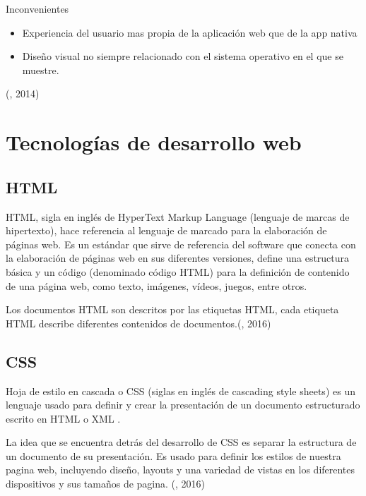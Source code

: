 Inconvenientes

\begin{itemize}

	\item Experiencia del usuario mas propia de la aplicación web que de la app nativa
	
	\item Diseño visual no siempre relacionado con el sistema operativo en el que se muestre.
	
\end{itemize}


(\citet{tipoaplicacionesmobilesbib}, 2014)
\section{Tecnologías de desarrollo web}

\subsection{HTML}

\setlength{\parskip}{5mm}

HTML, sigla en inglés de HyperText Markup Language (lenguaje de marcas de hipertexto), hace referencia al lenguaje de marcado para la elaboración de páginas web. Es un estándar que sirve de referencia del software que conecta con la elaboración de páginas web en sus diferentes versiones, define una estructura básica y un código (denominado código HTML) para la definición de contenido de una página web, como texto, imágenes, vídeos, juegos, entre otros. 

Los documentos HTML son descritos por las etiquetas HTML, cada etiqueta HTML describe diferentes contenidos de documentos.(\citet{htmlbib}, 2016)

\setlength{\parskip}{0mm}

\subsection{CSS}
\setlength{\parskip}{5mm}
Hoja de estilo en cascada o CSS (siglas en inglés de cascading style sheets) es un lenguaje usado para definir y crear la presentación de un documento estructurado escrito en HTML o XML . 

La idea que se encuentra detrás del desarrollo de CSS es separar la estructura de un documento de su presentación. Es usado para definir los estilos de nuestra pagina web, incluyendo diseño, layouts y una variedad de vistas en los diferentes dispositivos y sus tamaños de pagina. (\citet{cssbib}, 2016)
\setlength{\parskip}{0mm}

